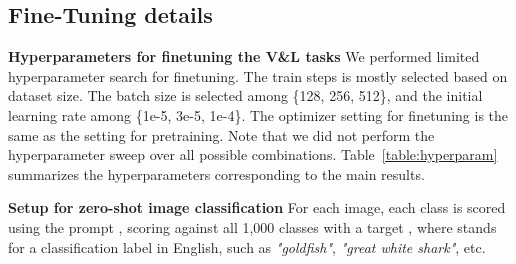 \begin{table}[ht!]
\centering
{}
\caption{Mixing ratio of each task for pretraining}
\label{table:mixture_ratio}
\end{table}

\subsection{Fine-Tuning details}
\label{app:details}

\textbf{Hyperparameters for finetuning the V\&L tasks} We performed limited hyperparameter search for finetuning. The train steps is mostly selected based on dataset size. The batch size is selected among \{128, 256, 512\}, and the initial learning rate among \{1e-5, 3e-5, 1e-4\}. The optimizer setting for finetuning is the same as the setting for pretraining. Note that we did not perform the hyperparameter sweep over all possible combinations. Table~\ref{table:hyperparam} summarizes the hyperparameters corresponding to the main results.
\begin{table}[ht!]
\centering
{}
\caption{Hyper-parameters used in fine-tuning experiments.}
\label{table:hyperparam}
\end{table}

\textbf{Setup for zero-shot image classification}
For each image, each class is scored using the prompt , scoring against all 1,000 classes with a target , where  stands for a classification label in English, such as \emph{"goldfish"}, \emph{"great white shark"}, etc.

